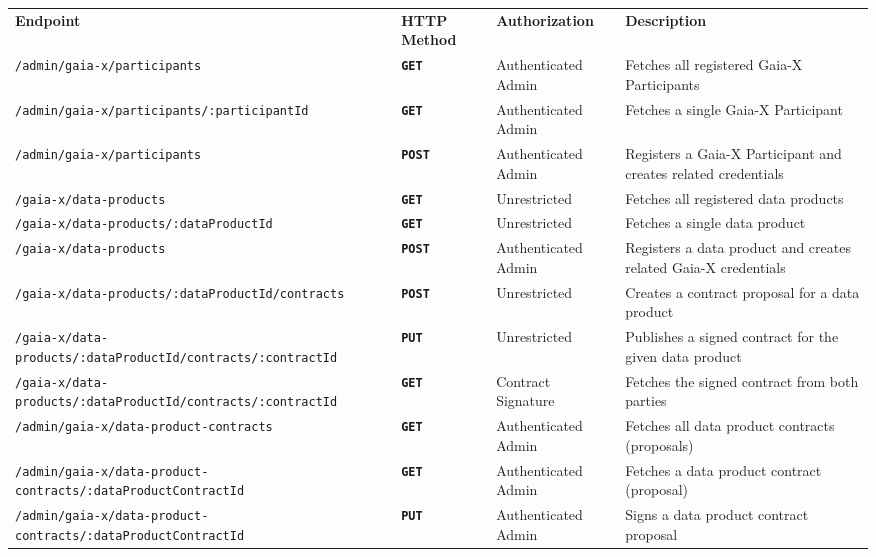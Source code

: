 \begin{longtable}{ |p{4cm}|p{2cm}|p{3cm}|p{6cm}| }
    \hhline{----}
    \textbf{Endpoint} & \textbf{HTTP Method} & \textbf{Authorization} & \textbf{Description}\\
    \hhline{----}
    \texttt{/admin/gaia-x/participants} & \textbf{\texttt{GET}} & Authenticated Admin & Fetches all registered Gaia-X Participants\\
    \hhline{----}
    \texttt{/admin/gaia-x/participants/:participantId} & \textbf{\texttt{GET}} & Authenticated Admin & Fetches a single Gaia-X Participant\\
    \hhline{----}
    \texttt{/admin/gaia-x/participants} & \textbf{\texttt{POST}} & Authenticated Admin & Registers a Gaia-X Participant and creates related credentials\\
    \hhline{----}
    \texttt{/gaia-x/data-products} & \textbf{\texttt{GET}} & Unrestricted & Fetches all registered data products\\
    \hhline{----}
    \texttt{/gaia-x/data-products/:dataProductId} & \textbf{\texttt{GET}} & Unrestricted & Fetches a single data product\\
    \hhline{----}
    \texttt{/gaia-x/data-products} & \textbf{\texttt{POST}} & Authenticated Admin & Registers a data product and creates related Gaia-X credentials\\
    \hhline{----}
    \texttt{/gaia-x/data-products/:dataProductId/contracts} & \textbf{\texttt{POST}} & Unrestricted & Creates a contract proposal for a data product\\
    \hhline{----}
    \texttt{/gaia-x/data-products/:dataProductId/contracts/:contractId} & \textbf{\texttt{PUT}} & Unrestricted & Publishes a signed contract for the given data product\\
    \hhline{----}
    \texttt{/gaia-x/data-products/:dataProductId/contracts/:contractId} & \textbf{\texttt{GET}} & Contract Signature & Fetches the signed contract from both parties\\
    \hhline{----}
    \texttt{/admin/gaia-x/data-product-contracts} & \textbf{\texttt{GET}} & Authenticated Admin & Fetches all data product contracts (proposals)\\
    \hhline{----}
    \texttt{/admin/gaia-x/data-product-contracts/:dataProductContractId} & \textbf{\texttt{GET}} & Authenticated Admin & Fetches a data product contract (proposal)\\
    \hhline{----}
    \texttt{/admin/gaia-x/data-product-contracts/:dataProductContractId} & \textbf{\texttt{PUT}} & Authenticated Admin & Signs a data product contract proposal\\

\end{longtable}
